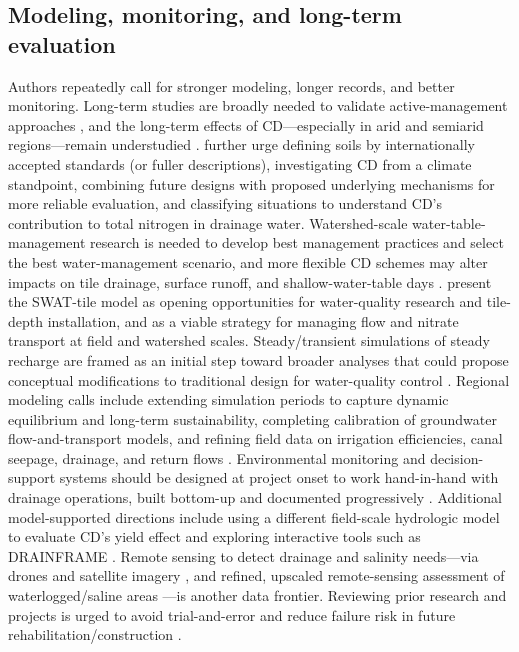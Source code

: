 \subsection{Modeling, monitoring, and long-term evaluation}
Authors repeatedly call for stronger modeling, longer records, and better monitoring. Long-term studies are broadly needed to validate active-management approaches \parencite{Ayars2006b}, and the long-term effects of CD---especially in arid and semiarid regions---remain understudied \parencite{Wang2020c}. \textcite{Wang2020c} further urge defining soils by internationally accepted standards (or fuller descriptions), investigating CD from a climate standpoint, combining future designs with proposed underlying mechanisms for more reliable evaluation, and classifying situations to understand CD's contribution to total nitrogen in drainage water. Watershed-scale water-table-management research is needed to develop best management practices and select the best water-management scenario, and more flexible CD schemes may alter impacts on tile drainage, surface runoff, and shallow-water-table days \parencite{Golmohammadi2016}. \textcite{Kim2023} present the SWAT-tile model as opening opportunities for water-quality research and tile-depth installation, and as a viable strategy for managing flow and nitrate transport at field and watershed scales. Steady/transient simulations of steady recharge are framed as an initial step toward broader analyses that could propose conceptual modifications to traditional design for water-quality control \parencite{GRISMER1993}. Regional modeling calls include extending simulation periods to capture dynamic equilibrium and long-term sustainability, completing calibration of groundwater flow-and-transport models, and refining field data on irrigation efficiencies, canal seepage, drainage, and return flows \parencite{Triana2010}. Environmental monitoring and decision-support systems should be designed at project onset to work hand-in-hand with drainage operations, built bottom-up and documented progressively \parencite{Quinn2009}. Additional model-supported directions include using a different field-scale hydrologic model to evaluate CD's yield effect \parencite{BinShokrana2023} and exploring interactive tools such as DRAINFRAME \parencite{Gopalakrishnan2007}. Remote sensing to detect drainage and salinity needs---via drones and satellite imagery \parencite{Yannopoulos2020}, and refined, upscaled remote-sensing assessment of waterlogged/saline areas \parencite{Gopalakrishnan2007}---is another data frontier. Reviewing prior research and projects is urged to avoid trial-and-error and reduce failure risk in future rehabilitation/construction \parencite{Valipour2014}.

